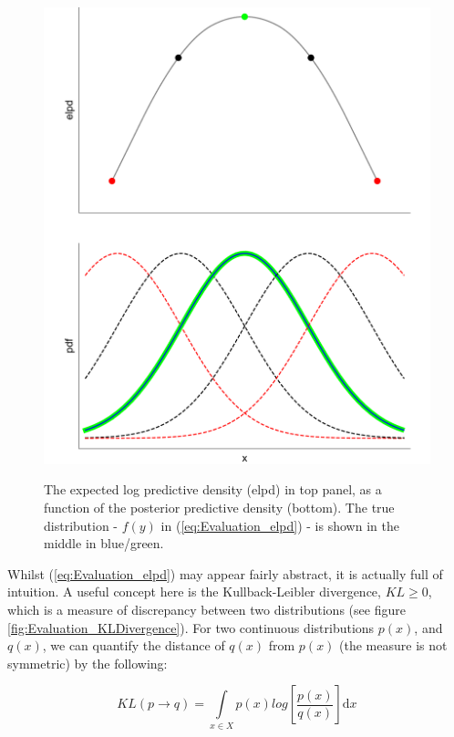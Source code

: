 \documentclass[11pt,fullpage]{book}
\begin{document}
\begin{figure}
\centering
\scalebox{0.5} 
{\includegraphics{Evaluation_elpd.pdf}}
\caption{The expected log predictive density (elpd) in top panel, as a function of the posterior predictive density (bottom). The true distribution - $f(y)$ in (\ref{eq:Evaluation_elpd}) - is shown in the middle in blue/green.}\label{fig:Evaluation_elpd}
\end{figure}


Whilst (\ref{eq:Evaluation_elpd}) may appear fairly abstract, it is actually full of intuition. A useful concept here is the Kullback-Leibler divergence, $KL\geq 0$, which is a measure of discrepancy between two distributions (see figure \ref{fig:Evaluation_KLDivergence}). For two continuous distributions $p(x)$, and $q(x)$, we can quantify the distance of $q(x)$ from $p(x)$ (the measure is not symmetric) by the following:

\begin{equation}\label{eq:Evaluation_KL}
KL(p\rightarrow q) = \int\limits_{x\in X} p(x) log\left[\frac{p(x)}{q(x)}\right]\mathrm{d}x
\end{equation}
\end{document}
